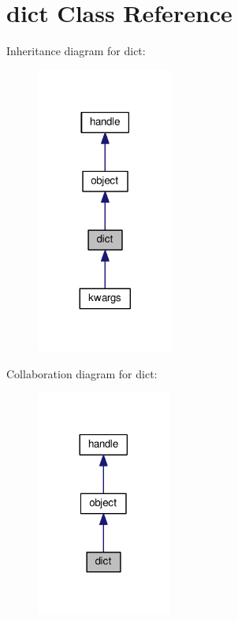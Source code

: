 \hypertarget{classdict}{}\section{dict Class Reference}
\label{classdict}


Inheritance diagram for dict\+:
\nopagebreak
\begin{figure}[H]
\begin{center}
\leavevmode
\includegraphics[width=128pt]{classdict__inherit__graph}
\end{center}
\end{figure}


Collaboration diagram for dict\+:
\nopagebreak
\begin{figure}[H]
\begin{center}
\leavevmode
\includegraphics[width=125pt]{classdict__coll__graph}
\end{center}
\end{figure}
